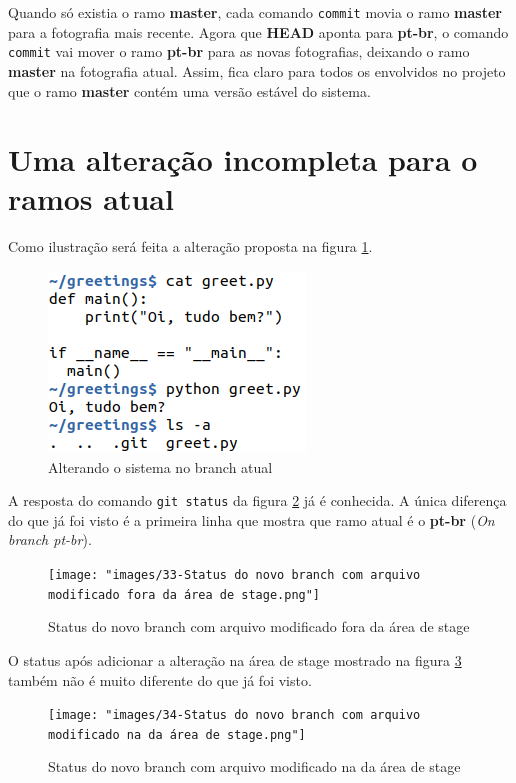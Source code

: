 \documentclass[a4paper]{book}
\begin{document}
Quando só existia o ramo \textbf{master}, cada comando
\texttt{commit} movia o ramo \textbf{master} para a
fotografia mais recente.
Agora que \textbf{HEAD} aponta para \textbf{pt-br},
o comando \texttt{commit} vai mover o ramo \textbf{pt-br}
para as novas fotografias, deixando o ramo
\textbf{master} na fotografia atual.
Assim, fica claro para todos os envolvidos no projeto
que o ramo \textbf{master} contém uma versão estável
do sistema.

\section{Uma alteração incompleta para o ramos atual}

Como ilustração será feita a alteração proposta na
figura \ref{fig:32}.

\begin{figure}[ht]
\caption{Alterando o sistema no branch atual}
\label{fig:32}
\centering
\includegraphics[scale=0.6]{"images/32-Alterando o sistema no branch atual.png"}
\end{figure}

A resposta do comando \texttt{git status} da figura
\ref{fig:33} já é conhecida. 
A única diferença do que já foi visto é a primeira linha
que mostra que ramo atual é o \textbf{pt-br} 
(\textit{On branch pt-br}).

\begin{figure}[ht]
\caption{Status do novo branch com arquivo modificado fora da área de stage}
\label{fig:33}
\centering
\texttt{[image: "images/33-Status do novo branch com arquivo modificado fora da área de stage.png"]}
\end{figure}

O status após adicionar a alteração na área de stage
mostrado na figura \ref{fig:34} também não é muito 
diferente do que já foi visto.

\begin{figure}[ht]
\caption{Status do novo branch com arquivo modificado na da área de stage}
\label{fig:34}
\centering
\texttt{[image: "images/34-Status do novo branch com arquivo modificado na da área de stage.png"]}
\end{figure}
\end{document}

